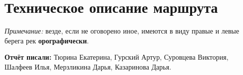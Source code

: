 \section{Техническое описание маршрута}
\textit{Примечание:} везде, если не оговорено иное, имеются в виду правые и левые берега рек \textbf{орографически}.

\textbf{Отчёт писали:} Тюрина Екатерина, Гурский Артур, Суровцева Виктория, Шалфеев Илья, Мерзликина Дарья, Казаринова Дарья.


 
 
 
 
 
 
 
 
 
 
